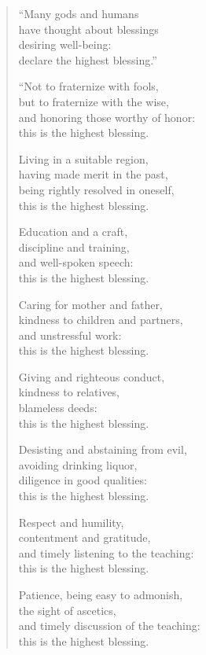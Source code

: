 \documentclass[12pt,openany]{book}%
\begin{document}
\begin{verse}%
“Many gods and humans \\
have thought about blessings \\
desiring well-being: \\
declare the highest blessing.” 

“Not to fraternize with fools, \\
but to fraternize with the wise, \\
and honoring those worthy of honor: \\
this is the highest blessing. 

Living in a suitable region, \\
having made merit in the past, \\
being rightly resolved in oneself, \\
this is the highest blessing. 

Education and a craft, \\
discipline and training, \\
and well-spoken speech: \\
this is the highest blessing. 

Caring for mother and father, \\
kindness to children and partners, \\
and unstressful work: \\
this is the highest blessing. 

Giving and righteous conduct, \\
kindness to relatives, \\
blameless deeds: \\
this is the highest blessing. 

Desisting and abstaining from evil, \\
avoiding drinking liquor, \\
diligence in good qualities: \\
this is the highest blessing. 

Respect and humility, \\
contentment and gratitude, \\
and timely listening to the teaching: \\
this is the highest blessing. 

Patience, being easy to admonish, \\
the sight of ascetics, \\
and timely discussion of the teaching: \\
this is the highest blessing. 


\end{verse}
\end{document}
